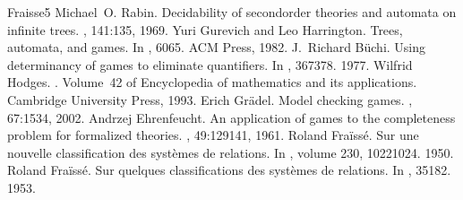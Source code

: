 \documentclass[letterpaper,10pt,english]{sphinxmanual}
\begin{document}
\begin{sphinxthebibliography}{Fraisse5}
Michael O. Rabin. Decidability of second\sphinxhyphen{}order theories and automata on infinite trees. , 141:1\textendash{}35, 1969.
Yuri Gurevich and Leo Harrington. Trees, automata, and games. In , 60\textendash{}65. ACM Press, 1982.
J. Richard Büchi. Using determinancy of games to eliminate quantifiers. In , 367\textendash{}378. 1977.
Wilfrid Hodges. . Volume 42 of Encyclopedia of mathematics and its applications. Cambridge University Press, 1993.
Erich Grädel. Model checking games. , 67:15\textendash{}34, 2002.
Andrzej Ehrenfeucht. An application of games to the completeness problem for formalized theories. , 49:129\textendash{}141, 1961.
Roland Fraïssé. Sur une nouvelle classification des systèmes de relations. In , volume 230, 1022\textendash{}1024. 1950.
Roland Fraïssé. Sur quelques classifications des systèmes de relations. In , 35\textendash{}182. 1953.
\end{sphinxthebibliography}







\renewcommand{\indexname}{Index}
\printindex
\end{document}
